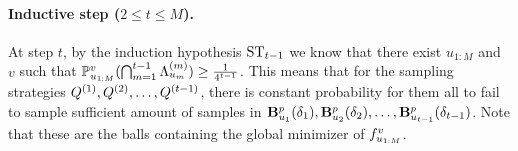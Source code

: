 
\paragraph{Inductive step ($2 \leq t \leq M$).}
At step $t$, by the induction hypothesis $\textup{ST}_{t-1}$ we know that there exist $u_{1:M}$ and $v$ 
such that $\mathbb{P}_{u_{1:M}}^v (\bigcap_{m=1}^{t-1} \Lambda_{u_{m}}^{({m})} ) \geq \frac{1}{4^{t-1}}$.
This means that for the sampling strategies $Q^{({1})}, Q^{({2})}, \dots, Q^{({t-1})}$,
there is constant probability for them all to fail to sample sufficient amount of samples 
in $\mathbf{B}^p_{u_{1}}({\delta_{1}}), \mathbf{B}^p_{u_{2}}({\delta_{2}}), \dots, \mathbf{B}^p_{u_{t-1}}({\delta_{t-1}})$.
Note that these are the balls containing the global minimizer of $f_{u_{1:M}}^v$.

